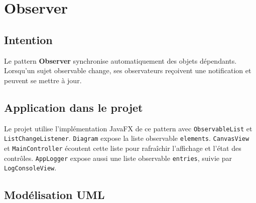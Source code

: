 \documentclass[12pt,a4paper]{article}
\begin{document}
\section{Observer}

\subsection{Intention}

Le pattern \textbf{Observer} synchronise automatiquement des objets dépendants. Lorsqu'un sujet observable change, ses observateurs reçoivent une notification et peuvent se mettre à jour.

\subsection{Application dans le projet}

Le projet utilise l'implémentation JavaFX de ce pattern avec \texttt{ObservableList} et \texttt{ListChangeListener}. \texttt{Diagram} expose la liste observable \texttt{elements}. \texttt{CanvasView} et \texttt{MainController} écoutent cette liste pour rafraîchir l'affichage et l'état des contrôles. \texttt{AppLogger} expose aussi une liste observable \texttt{entries}, suivie par \texttt{LogConsoleView}.

\subsection{Modélisation UML}
\end{document}

